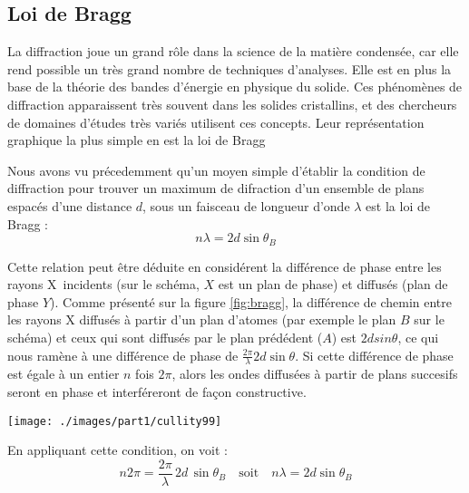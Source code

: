 \subsection{Loi de Bragg}

La diffraction joue un grand rôle dans la science de la matière condensée, car elle rend possible un très grand nombre de techniques d'analyses. Elle est en plus la base de la théorie des bandes d'énergie en physique du solide.
Ces phénomènes de diffraction apparaissent très souvent dans les solides cristallins, et des chercheurs de domaines d'études très variés utilisent ces concepts. Leur représentation graphique la plus simple en est la loi de Bragg

Nous avons vu précedemment qu'un moyen simple d'établir la condition de diffraction pour
trouver un maximum de difraction d'un ensemble de plans espacés d'une distance
$d$, sous un faisceau de longueur d'onde $\lambda$ est la loi de Bragg :
\begin{equation}
    n \lambda = 2d \sin \theta_B
\end{equation}

Cette relation peut être déduite en considérent la
différence de phase entre les rayons X incidents (sur le schéma, $X$ est un plan de phase) et diffusés (plan de phase $Y$). Comme
présenté sur la figure \ref{fig:bragg}, la différence de chemin entre les rayons X diffusés
à partir d'un plan d'atomes (par exemple le plan $B$ sur le schéma) et ceux qui sont diffusés par le plan prédédent ($A$) est $2d sin \theta$, ce qui nous ramène à une différence de phase de
$\frac{2\pi}{\lambda} 2d \sin \theta$. Si cette différence de phase est égale à
un entier $n$ fois $2\pi$, alors les ondes diffusées à partir de plans succesifs
seront en phase et interféreront de façon constructive.

\begin{figure*}
    \texttt{[image: ./images/part1/cullity99]}
    \caption{Diffraction des rayons X par un cristal. La loi de Bragg peut être retrouvée en écrivant que la différence de chemin optique entre $QK$ et $PR$ est nulle et celle entre $ML$ et $LN$ est égale à $2d'\sin\theta$}
    \label{fig:bragg}
\end{figure*}

En appliquant cette condition, on voit :
\begin{equation}
    n 2 \pi = \frac{2 \pi}{\lambda}\, 2d\, \sin \theta_B \quad\text{soit}\quad
    n\lambda = 2d \sin \theta_B
\end{equation}

